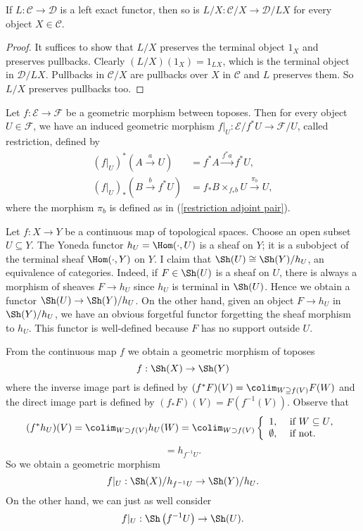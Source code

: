 \begin{lemma}
\label{left exact restriction}
If $L : \mathcal{C} \to \mathcal{D}$ is a left exact functor, then so is $L/X : \mathcal{C}/X \to \mathcal{D}/LX$ for every object $X \in \mathcal{C}$.
\end{lemma}
\begin{proof}
It suffices to show that $L/X$ preserves the terminal object $1_X$ and preserves pullbacks. Clearly $(L/X)(1_X) = 1_{LX}$, which is the terminal object in $\mathcal{D}/LX$. Pullbacks in $\mathcal{C}/X$ are pullbacks over $X$ in $\mathcal{C}$ and $L$ preserves them. So $L/X$ preserves pullbacks too.
\end{proof}

\begin{proposition}
Let $f : \mathscr{E} \to \mathscr{F}$ be a geometric morphism between toposes. Then for every object $U \in \mathscr{F}$, we have an induced geometric morphism $f|_U : \mathscr{E}/f^*U \to \mathscr{F}/U$, called restriction, defined by
\begin{align*}
\left(f|_U\right)^* \left( A \xrightarrow{a} U \right) &= f^*A \xrightarrow{f^*a} f^*U, \\
\left(f|_U\right)_*(B \xrightarrow{b} f^*U) &= f_*B \times_{f_*b} U \xrightarrow{\pi_b} U,
\end{align*}
where the morphism $\pi_b$ is defined as in (\ref{restriction adjoint pair}).
\end{proposition}

\begin{example}
Let $f : X \to Y$ be a continuous map of topological spaces. Choose an open subset $U \subseteq Y$. The Yoneda functor $h_U = \Hom(\cdot, U)$ is a sheaf on $Y$; it is a subobject of the terminal sheaf $\Hom(\cdot, Y)$ on $Y$. I claim that $\Sh(U) \cong \Sh(Y) / h_U$, an equivalence of categories. Indeed, if $F \in \Sh(U)$ is a sheaf on $U$, there is always a morphism of sheaves $F \to h_U$ since $h_U$ is terminal in $\Sh(U)$. Hence we obtain a functor $\Sh(U) \to \Sh(Y)/h_U$. On the other hand, given an object $F \to h_U$ in $\Sh(Y)/h_U$, we have an obvious forgetful functor forgetting the sheaf morphism to $h_U$. This functor is well-defined because $F$ has no support outside $U$.

From the continuous map $f$ we obtain a geometric morphism of toposes
\[ f : \Sh(X) \to \Sh(Y) \]
where the inverse image part is defined by $(f^*F)(V) = \colim_{W \supseteq f(V)} F(W)$ and the direct image part is defined by $(f_*F)(V) = F(f^{-1}(V))$. Observe that
\[ (f^*h_U)(V) = \colim_{W \supset f(V)} h_U(W) = \colim_{W \supset f(V)} \left\{ \begin{array}{ll} 1,& \text{ if $W \subseteq U$}, \\ \emptyset,& \text{ if not}. \end{array} \right. \]
\[ = h_{f^{-1}U}. \]
So we obtain a geometric morphism
\[ f|_U : \Sh(X) / h_{f^{-1}U} \to \Sh(Y) / h_U. \]
On the other hand, we can just as well consider
\[ f|_U : \Sh\left(f^{-1}U \right) \to \Sh(U). \]
\end{example}
